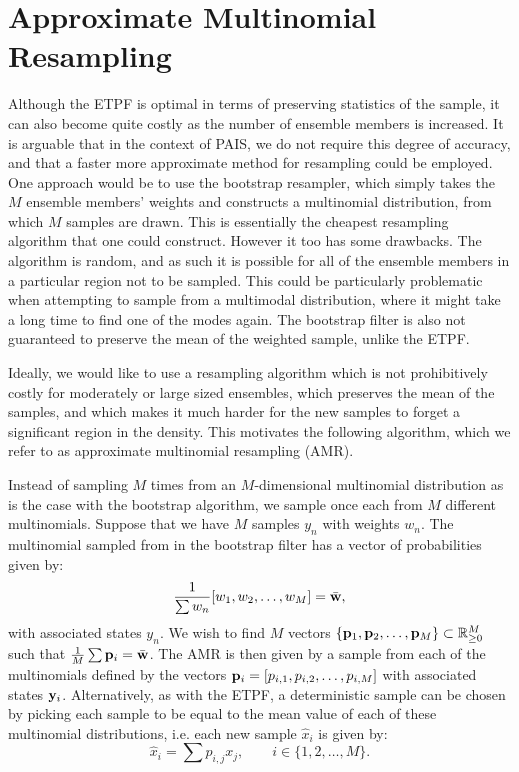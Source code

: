 \documentclass[final]{siamltex}
\begin{document}
\section{Approximate Multinomial Resampling}\label{sec:AMR}
Although the ETPF is optimal in terms of preserving statistics of the
sample, it can also become quite costly as the number of ensemble members
is increased. It is arguable that in the context of PAIS, we do not
require this degree of accuracy, and that a faster more approximate
method for resampling could be employed. One approach would be to use
the bootstrap resampler, which simply takes the $M$ ensemble members'
weights and constructs a multinomial distribution, from which $M$
samples are drawn. This is essentially the cheapest resampling
algorithm that one could construct. However it too has some
drawbacks. The algorithm is random, and as such it is possible for all
of the ensemble members in a particular region not to be sampled. This
could be particularly problematic when attempting to sample from a
multimodal distribution, where it might take a long time to find one
of the modes again. The bootstrap filter is also not guaranteed to
preserve the mean of the weighted sample, unlike the ETPF.

Ideally, we would like to use a resampling algorithm which is not
prohibitively costly for moderately or large sized ensembles,
which preserves the mean of the samples, and which makes it much
harder for the new samples to forget a significant region in the
density. This motivates the following algorithm, which we refer to as
approximate multinomial resampling (AMR).

Instead of sampling $M$ times from an $M$-dimensional multinomial
distribution as is the case with the bootstrap algorithm, we sample
once each from $M$ different multinomials. Suppose that we have $M$
samples $y_n$ with weights $w_n$. The multinomial sampled from in the
bootstrap filter has a vector of probabilities given by:
\begin{equation*}
\frac{1}{\sum w_n} [w_1,w_2,\ldots,w_M] = \bar{\bf w},
\end{equation*}
with associated states $y_n$.
We wish to find $M$ vectors $\{{\bf p}_1,{\bf p}_2,\ldots,{\bf p}_M\}
\subset \mathbb{R}^M_{\ge 0}$
such that  $\frac{1}{M} \sum {\bf p}_i = \bar{\bf w}$. The AMR is then
given by a sample from each of the multinomials defined by the vectors
${\bf p}_i = [p_{i,1},p_{i,2},\ldots,p_{i,M}]$ with associated states ${\bf y}_i$. Alternatively, as with the ETPF, a deterministic sample
can be chosen by picking each sample to be equal to the mean value of
each of these multinomial distributions, i.e. each new sample
$\hat{x}_i$ is given by:
\begin{equation}
\hat{x}_i = \sum p_{i,j} x_j, \qquad i \in \{1,2,\ldots,M\}.
\end{equation}
\end{document}
